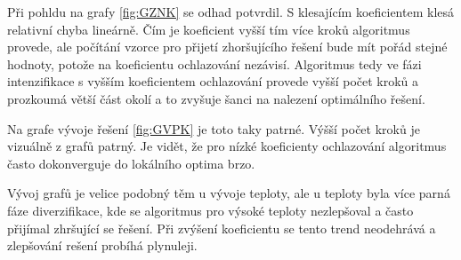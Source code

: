 \documentclass[11pt]{article}
\begin{document}
Při pohldu na grafy \ref{fig:GZNK} se odhad potvrdil. S klesajícím koeficientem klesá relativní chyba lineárně. Čím je koeficient vyšší tím více kroků algoritmus provede, ale počítání vzorce pro přijetí zhoršujícího řešení bude mít pořád stejné hodnoty, potože na koeficientu ochlazování nezávisí. Algoritmus tedy ve fázi intenzifikace s vyšším koeficientem ochlazování provede vyšší počet kroků a prozkoumá větší část okolí a to zvyšuje šanci na nalezení optimálního řešení. 

Na grafe vývoje řešení \ref{fig:GVPK} je toto taky patrné. Výšší počet kroků je vizuálně z grafů patrný. Je vidět, že pro nízké koeficienty ochlazování algoritmus často dokonverguje do lokálního optima brzo. 

Vývoj grafů je velice podobný těm u vývoje teploty, ale u teploty byla více parná fáze diverzifikace, kde se algoritmus pro výsoké teploty nezlepšoval a často přijímal zhršující se řešení. Při zvýšení koeficientu se tento trend neodehrává a zlepšování rešení probíhá plynuleji. 
\end{document}
